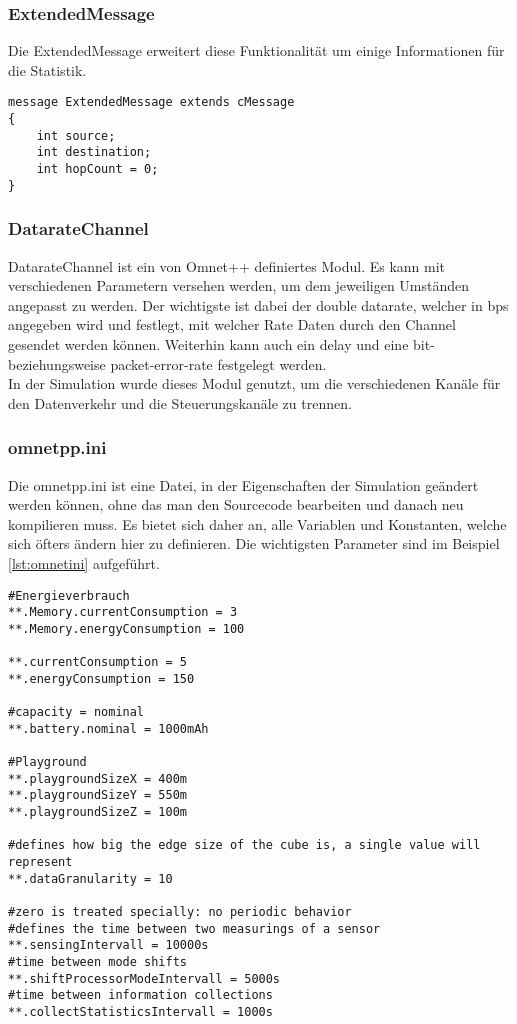 \subsubsection{ExtendedMessage}

Die ExtendedMessage erweitert diese Funktionalität um einige Informationen für die Statistik.

\begin{lstlisting}[language=ned,caption={ExtendedMessage},label=lst:ExtendedMessage]
message ExtendedMessage extends cMessage
{
    int source;
    int destination;
    int hopCount = 0;    
}
\end{lstlisting}

\subsubsection{DatarateChannel}

DatarateChannel ist ein von Omnet++ definiertes Modul. Es kann mit verschiedenen Parametern versehen werden, um dem jeweiligen Umständen angepasst zu werden. Der wichtigste ist dabei der double datarate, welcher in bps angegeben wird und festlegt, mit welcher Rate Daten durch den Channel gesendet werden können. Weiterhin kann auch ein delay und eine bit- beziehungsweise packet-error-rate festgelegt werden.\\
In der Simulation wurde dieses Modul genutzt, um die verschiedenen Kanäle für den Datenverkehr und die Steuerungskanäle zu trennen.

\subsubsection{omnetpp.ini}

Die omnetpp.ini ist eine Datei, in der Eigenschaften der Simulation geändert werden können, ohne das man den Sourcecode bearbeiten und danach neu kompilieren muss. Es bietet sich daher an, alle Variablen und Konstanten, welche sich öfters ändern hier zu definieren. Die wichtigsten Parameter sind im Beispiel \ref{lst:omnetini} aufgeführt.

\begin{lstlisting}[language=ned,caption={wichtige Parameter für das ini-File},label=lst:omnetini]
#Energieverbrauch
**.Memory.currentConsumption = 3
**.Memory.energyConsumption = 100

**.currentConsumption = 5
**.energyConsumption = 150

#capacity = nominal
**.battery.nominal = 1000mAh

#Playground
**.playgroundSizeX = 400m
**.playgroundSizeY = 550m
**.playgroundSizeZ = 100m

#defines how big the edge size of the cube is, a single value will represent
**.dataGranularity = 10

#zero is treated specially: no periodic behavior
#defines the time between two measurings of a sensor
**.sensingIntervall = 10000s
#time between mode shifts
**.shiftProcessorModeIntervall = 5000s
#time between information collections
**.collectStatisticsIntervall = 1000s
\end{lstlisting}

